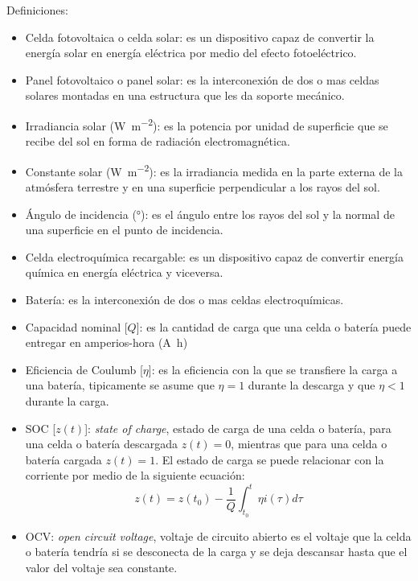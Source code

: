 \documentclass[12pt]{article}
\begin{document}


Definiciones:
\begin{itemize}
    \item Celda fotovoltaica o celda solar: es un dispositivo capaz de convertir la energía solar en energía eléctrica por medio del efecto fotoeléctrico. 
    \item Panel fotovoltaico o panel solar: es la interconexión de dos o mas celdas solares montadas en una estructura que les da soporte mecánico. 
    \item Irradiancia solar (\si{\watt\meter^{-2}}): es la potencia por unidad de superficie que se recibe del sol en forma de radiación electromagnética.
    \item Constante solar (\si{\watt\meter^{-2}}): es la irradiancia medida en la parte externa de la atmósfera terrestre y en una superficie perpendicular a los rayos del sol.
    \item Ángulo de incidencia (\si{\degree}): es el ángulo entre los rayos del sol y la normal de una superficie en el punto de incidencia. 
    \item Celda electroquímica recargable: es un dispositivo capaz de convertir energía química en energía eléctrica y viceversa. 
    \item Batería: es la interconexión de dos o mas celdas electroquímicas.
    \item Capacidad nominal [$Q$]: es la cantidad de carga que una celda o batería puede entregar en amperios-hora (\si{\ampere\hour})
    \item Eficiencia de Coulumb [$\eta$]: es la eficiencia con la que se transfiere la carga a una batería, tipicamente se asume que $\eta = 1$ durante la descarga y que $\eta < 1$ durante la carga. 
    \item SOC [$z(t)$]: \emph{state of charge}, estado de carga de una celda o batería, para una celda o batería descargada $z(t) = 0$, mientras que para una celda o batería cargada $z(t) = 1$. El estado de carga se puede relacionar con la corriente por medio de la siguiente ecuación:
    \begin{equation*}
        z(t) = z(t_0) - \dfrac{1}{Q}\int_{t_0}^t \eta i(\tau) d\tau
    \end{equation*}
    \item OCV: \emph{open circuit voltage}, voltaje de circuito abierto es el voltaje que la celda o batería tendría si se desconecta de la carga y se deja descansar hasta que el valor del voltaje sea constante.
\end{itemize}
\end{document}
